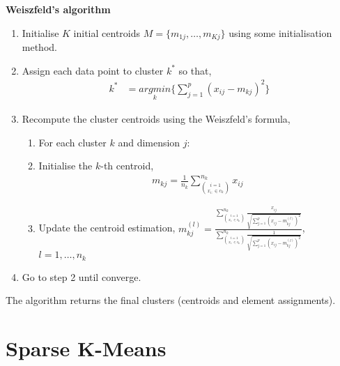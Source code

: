 \documentclass[12pt]{article}
\begin{document}
\begin{center}
	\begin{tcolorbox}[breakable,colback=white!100!white,colframe=black!100!black]
		\noindent\textbf{Weiszfeld's algorithm}\label{algoweis}
		\begin{enumerate}
			\item Initialise $K$ initial centroids $M = \{m_{1j}, \dots, m_{Kj}\}$ using some initialisation method. 
			
			\item Assign each data point to cluster $k^*$ so that,
			\begin{align}\nonumber
			k^* &= \underset{k}{argmin}\bigg\{ \sum_{j=1}^{p} (x_{ij}-m_{kj})^2    \bigg\}
			\end{align}		
			
			\item Recompute the cluster centroids using the Weiszfeld's formula,
			
			\begin{enumerate}
				\item For each cluster $k$ and dimension $j$:
				\item Initialise the $k$-th centroid,
				\begin{align}\nonumber
				m_{kj} = \frac{1}{n_k}\sum_{\binom{i=1}{x_{i:} \in c_k}}^{n_k} x_{ij}
				\end{align}	
				\item Update the centroid estimation, $m_{kj}^{(l)} = \frac{\sum_{\binom{i=1}{x_{i:} \in c_k}}^{n_k} \frac{x_{ij}}{
						\sqrt{		\sum_{j=1}^{p}
							(x_{ij}-m_{kj}^{(l)})^2}}}{\sum_{\binom{i=1}{x_{i:} \in c_k}}^{n_k}\frac{1}{
						\sqrt{		\sum_{j=1}^{p}
							(x_{ij}-m_{kj}^{(l)})^2}}}$, \\$l = 1, \dots, n_k$
			\end{enumerate}			
			
			\item Go to step 2 until converge.	
			
		\end{enumerate}	
		The algorithm returns the final clusters (centroids and element assignments).
	\end{tcolorbox}
\end{center}	


\cleardoublepage


\section{Sparse K-Means}
\end{document}
